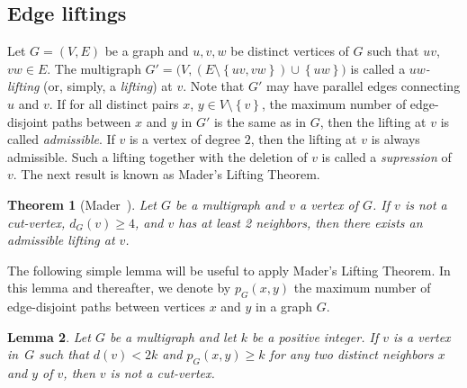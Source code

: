 \documentclass[12pt,reqno,a4paper]{amsart}
\newtheorem{theorem}{Theorem}[section]
\newtheorem{lemma}[theorem]{Lemma}
\newcommand{\aset}[1]{\left\{#1\right\}}
\begin{document}
\subsection{Edge liftings}
Let $G = (V,E)$ be a graph and $u,v,w$ be distinct vertices of $G$
such that $uv$, $vw \in E$. The multigraph
$G' = \big(V, (E \setminus \aset{uv,vw}) \cup \aset{uw}\big)$ is
called a \emph{\(uw\)-lifting}
(or, simply, a \emph{lifting}) at \(v\).
Note that $G'$ may have parallel edges connecting $u$ and $v$.
If for all distinct pairs $x$, $y \in V \setminus \aset{v}$, the
maximum number of edge-disjoint paths between $x$ and $y$ in $G'$ is
the same as in $G$, then the lifting at \(v\)
is called \emph{admissible}.  If \(v\)
is a vertex of degree \(2\),
then the lifting at \(v\)
is always admissible. Such a lifting together with the
deletion of \(v\)
is called a \emph{supression} of \(v\).
The next result is known as Mader's Lifting Theorem.

\begin{theorem}[Mader~\cite{Ma78}]\label{thm:Mader}
	Let $G$ be a  multigraph and $v$ a vertex of $G$. 
	If $v$ is not a cut-vertex, \hbox{$d_G(v) \geq 4$,} and $v$ has at least 2 neighbors, 
	then there exists an admissible lifting at $v$. 
\end{theorem}


The following simple lemma will be useful to apply Mader's
  Lifting Theorem.  In this lemma and thereafter, we denote by
  \(p_G(x,y)\) the maximum number of edge-disjoint paths between vertices \(x\)
  and \(y\) in a graph $G$.

\begin{lemma}\label{lemma:non-cut-vertex}
	Let \(G\) be a multigraph and let \(k\)
	be a positive integer. If $v$ is a vertex in~$G$ such that $d(v)<2k$ and
	$p_G(x,y)\geq k$ for any two distinct neighbors \(x\) and \(y\) of \(v\), 
	then $v$ is not a cut-vertex.
\end{lemma}

\end{document}
